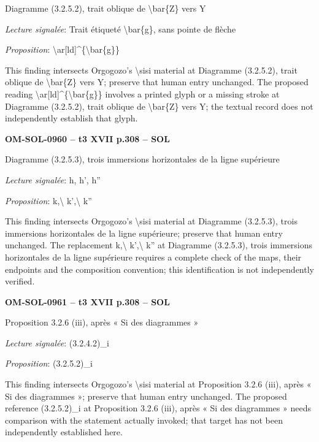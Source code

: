 Diagramme (3.2.5.2), trait oblique de \textbackslash{}bar\{Z\} vers Y\par
\emph{Lecture signalée}: Trait étiqueté \textbackslash{}bar\{g\}, sans pointe de flèche\par
\emph{Proposition}: \textbackslash{}ar[ld]\textasciicircum{}\{\textbackslash{}bar\{g\}\}\par
This finding intersects Orgogozo's \textbackslash{}sisi material at Diagramme (3.2.5.2), trait oblique de \textbackslash{}bar\{Z\} vers Y; preserve that human entry unchanged. The proposed reading \textbackslash{}ar[ld]\textasciicircum{}\{\textbackslash{}bar\{g\}\} involves a printed glyph or a missing stroke at Diagramme (3.2.5.2), trait oblique de \textbackslash{}bar\{Z\} vers Y; the textual record does not independently establish that glyph.\par
\par\noindent\textbf{OM-SOL-0960 -- t3 XVII p.308 -- SOL}\par
Diagramme (3.2.5.3), trois immersions horizontales de la ligne supérieure\par
\emph{Lecture signalée}: h, h', h''\par
\emph{Proposition}: k,\textbackslash{} k',\textbackslash{} k''\par
This finding intersects Orgogozo's \textbackslash{}sisi material at Diagramme (3.2.5.3), trois immersions horizontales de la ligne supérieure; preserve that human entry unchanged. The replacement k,\textbackslash{} k',\textbackslash{} k'' at Diagramme (3.2.5.3), trois immersions horizontales de la ligne supérieure requires a complete check of the maps, their endpoints and the composition convention; this identification is not independently verified.\par
\par\noindent\textbf{OM-SOL-0961 -- t3 XVII p.308 -- SOL}\par
Proposition 3.2.6 (iii), après « Si des diagrammes »\par
\emph{Lecture signalée}: (3.2.4.2)\_i\par
\emph{Proposition}: (3.2.5.2)\_i\par
This finding intersects Orgogozo's \textbackslash{}sisi material at Proposition 3.2.6 (iii), après « Si des diagrammes »; preserve that human entry unchanged. The proposed reference (3.2.5.2)\_i at Proposition 3.2.6 (iii), après « Si des diagrammes » needs comparison with the statement actually invoked; that target has not been independently established here.\par
